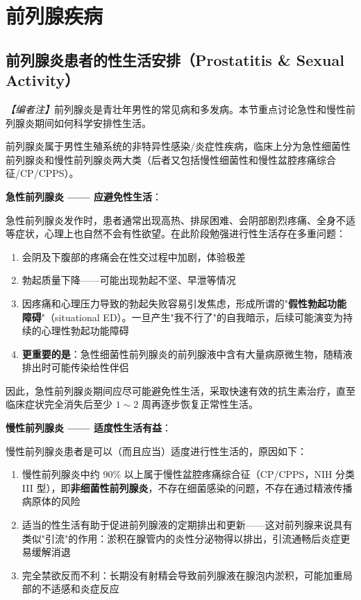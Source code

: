 \section{前列腺疾病}

\subsection{前列腺炎患者的性生活安排（Prostatitis \& Sexual Activity）}

\noindent\textit{【编者注】}前列腺炎是青壮年男性的常见病和多发病。本节重点讨论急性和慢性前列腺炎期间如何科学安排性生活。

\vspace{0.5em}
前列腺炎属于男性生殖系统的非特异性感染/炎症性疾病，临床上分为急性细菌性前列腺炎和慢性前列腺炎两大类（后者又包括慢性细菌性和慢性盆腔疼痛综合征/CP/CPPS）。

\vspace{0.5em}
\noindent\textbf{急性前列腺炎 —— 应避免性生活}：

急性前列腺炎发作时，患者通常出现高热、排尿困难、会阴部剧烈疼痛、全身不适等症状，心理上也自然不会有性欲望。在此阶段勉强进行性生活存在多重问题：

\begin{enumerate}
	\item 会阴及下腹部的疼痛会在性交过程中加剧，体验极差
	\item 勃起质量下降——可能出现勃起不坚、早泄等情况
	\item 因疼痛和心理压力导致的勃起失败容易引发焦虑，形成所谓的"\textbf{假性勃起功能障碍}"（situational ED）。一旦产生"我不行了"的自我暗示，后续可能演变为持续的心理性勃起功能障碍
	\item \textbf{更重要的是}：急性细菌性前列腺炎的前列腺液中含有大量病原微生物，随精液排出时可能传染给性伴侣
\end{enumerate}

因此，急性前列腺炎期间应尽可能避免性生活，采取快速有效的抗生素治疗，直至临床症状完全消失后至少 $1\sim2$ 周再逐步恢复正常性生活。

\vspace{0.5em}
\noindent\textbf{慢性前列腺炎 —— 适度性生活有益}：

慢性前列腺炎患者是可以（而且应当）适度进行性生活的，原因如下：

\begin{enumerate}
	\item 慢性前列腺炎中约 90\% 以上属于慢性盆腔疼痛综合征（CP/CPPS，NIH 分类 III 型），即\textbf{非细菌性前列腺炎}，不存在细菌感染的问题，不存在通过精液传播病原体的风险

	\item 适当的性生活有助于促进前列腺液的定期排出和更新——这对前列腺来说具有类似"引流"的作用：淤积在腺管内的炎性分泌物得以排出，引流通畅后炎症更易缓解消退

	\item 完全禁欲反而不利：长期没有射精会导致前列腺液在腺泡内淤积，可能加重局部的不适感和炎症反应
\end{enumerate}

